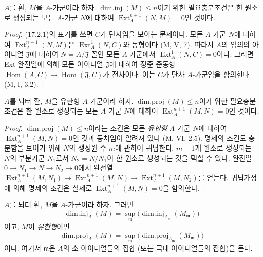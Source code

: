 \begin{lemma}[17.2.3]
\label{0.17.2.3-fr}
$A$를 환, $M$을 $A$-가군이라 하자.
$\operatorname{dim.inj}(M)\leq n$이기 위한 필요충분조건은 한 원소로
생성되는 모든 $A$-가군 $N$에 대하여
$\operatorname{Ext}^{n+1}_A(N,M)=0$인 것이다.
\end{lemma}

\begin{proof}
(17.2.1)의 표기를 쓰면 $C$가 단사임을 보이는 문제이다. 모든
$A$-가군 $N$에 대하여 $\operatorname{Ext}^{n+1}_A(N,M)$은
$\operatorname{Ext}^1_A(N,C)$와 동형이다 (M, V, 7). 따라서 $A$의
임의의 아이디얼 $\mathfrak{J}$에 대하여 $N=A/\mathfrak{J}$ 꼴인 모든
$A$-가군에서 $\operatorname{Ext}^1_A(N,C)=0$이다. 그러면 Ext 완전열에
의해 모든 아이디얼 $\mathfrak{J}$에 대하여 정준 준동형
$\operatorname{Hom}(A,C)\longrightarrow
\operatorname{Hom}(\mathfrak{J},C)$가 전사이다. 이는 $C$가 단사
$A$-가군임을 함의한다 (M, I, 3.2).
\end{proof}

\begin{lemma}[17.2.4]
\label{0.17.2.4-fr}
$A$를 뇌터 환, $M$을 유한형 $A$-가군이라 하자.
$\operatorname{dim.proj}(M)\leq n$이기 위한 필요충분조건은 한 원소로
생성되는 모든 $A$-가군 $N$에 대하여
$\operatorname{Ext}^{n+1}_A(M,N)=0$인 것이다.
\end{lemma}

\begin{proof}
$\operatorname{dim.proj}(M)\leq n$이라는 조건은 모든 \emph{유한형}
$A$-가군 $N$에 대하여 $\operatorname{Ext}^{n+1}_A(M,N)=0$인 것과
동치임이 알려져 있다 (M, VI, 2.5). 명제의 조건도 충분함을 보이기 위해
$N$의 생성원 수 $m$에 관하여 귀납한다. $m-1$개 원소로 생성되는
$N$의 부분가군 $N_1$로서 $N_2=N/N_1$이 한 원소로 생성되는 것을 택할
수 있다. 완전열
$0\longrightarrow N_1\longrightarrow N\longrightarrow N_2
\longrightarrow0$에서 완전열
$\operatorname{Ext}^{n+1}_A(M,N_1)\longrightarrow
\operatorname{Ext}^{n+1}_A(M,N)\longrightarrow
\operatorname{Ext}^{n+1}_A(M,N_2)$를 얻는다. 귀납가정에 의해 명제의
조건은 실제로 $\operatorname{Ext}^{n+1}_A(M,N)=0$을 함의한다.
\end{proof}

\begin{corollary}[17.2.5]
\label{0.17.2.5-fr}
$A$를 뇌터 환, $M$을 $A$-가군이라 하자. 그러면
\begin{equation}
\label{0.17.2.5.1-fr}
\tag{17.2.5.1}
  \operatorname{dim.inj}_A(M)
  =\sup_{\mathfrak{m}}
  \bigl(\operatorname{dim.inj}_{A_{\mathfrak{m}}}(M_{\mathfrak{m}})\bigr)
\end{equation}
이고, $M$이 \emph{유한형}이면
\begin{equation}
\label{0.17.2.5.2-fr}
\tag{17.2.5.2}
  \operatorname{dim.proj}_A(M)
  =\sup_{\mathfrak{m}}
  \bigl(\operatorname{dim.proj}_{A_{\mathfrak{m}}}(M_{\mathfrak{m}})\bigr)
\end{equation}
이다. 여기서 $\mathfrak{m}$은 $A$의 소 아이디얼들의 집합 (또는 극대
아이디얼들의 집합)을 돈다.
\end{corollary}

